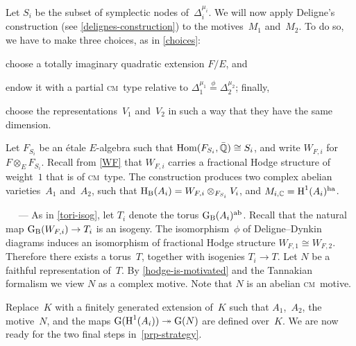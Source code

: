 \documentclass[10pt,twoside,leqno]{article}
\renewcommand{\paragraph}[1]{\par\bigskip\refstepcounter{subsection}%
 {\normalfont\normalsize\scshape\noindent\thesubsection%
 \ifthenelse{\equal{#1}{}}%
 {}%
 {\ \textls{#1.}}%
 \ ---}%
}
\numberwithin{equation}{subsection}
\newcommand{\onto}{\twoheadrightarrow}
\newcommand{\Hom}{\textnormal{Hom}}
\newcommand{\QQ}{\mathbb{Q}}
\newcommand{\QQbar}{\bar{\QQ}}
\newcommand{\CC}{\mathbb{C}}
\newcommand{\ab}{\textnormal{ab}}
\newcommand{\ha}{\textnormal{ha}}
\newcommand{\HH}{\textnormal{H}}
\newcommand{\HB}{\HH_{\textnormal{B}}}
\newcommand{\GG}{\textnormal{G}}
\newcommand{\GB}{\GG_{\textnormal{B}}}
\newcommand{\cm}{\textsc{cm}}
\begin{document}
Let $S_i$ be the subset of symplectic nodes of~$\Delta_i^{\mu_i}$.
We will now apply Deligne's construction (see \cref{delignes-construction})
to the motives~$M_1$ and~$M_2$.
To do so, we have to make three choices, as in \cref{choices}:
\begin{enumerate*}[label=(\textit{\roman*})]
\item choose a totally imaginary quadratic extension $F/E$, and
\item endow it with a partial \cm~type
 relative to $\Delta_1^{\mu_1} \stackrel{\phi}{=} \Delta_2^{\mu_2}$;
 finally,
\item choose the representations~$V_1$ and~$V_2$
 in such a way that they have the same dimension.
\end{enumerate*}
Let $F_{S_i}$ be an \'etale $E$-algebra such that
$\Hom(F_{S_i},\QQbar) \cong S_i$,
and write $W_{F,i}$ for $F \otimes_E F_{S_i}$.
Recall from \cref{WF} that $W_{F,i}$ carries a
fractional Hodge structure of weight~$1$ that is of \cm~type.
The construction produces two complex abelian varieties~$A_1$ and~$A_2$,
such that $\HB(A_i) = W_{F,i} \otimes_{F_{S_i}} V_i$,
and $M_{i,\CC} = \HH^1(A_i)^\ha$.

\paragraph{} %
As in \cref{tori-isog}, let $T_i$ denote the torus $\GB(A_i)^\ab$.
Recall that the natural map $\GB(W_{F,i}) \to T_i$ is an isogeny.
The isomorphism~$\phi$ of Deligne--Dynkin diagrams
induces an isomorphism of fractional Hodge structure $W_{F,1} \cong W_{F,2}$.
Therefore there exists a torus~$T$,
together with isogenies $T_i \to T$.
Let $N$ be a faithful representation of~$T$.
By \cref{hodge-is-motivated} and the Tannakian formalism
we view $N$ as a complex motive.
Note that $N$ is an abelian \cm~motive.

Replace~$K$ with a finitely generated extension of~$K$
such that $A_1$,~$A_2$, the motive~$N$,
and the maps $\GG(\HH^1(A_i)) \onto \GG(N)$
are defined over~$K$.
We are now ready for the two final steps in~\cref{prp-strategy}.
\end{document}
